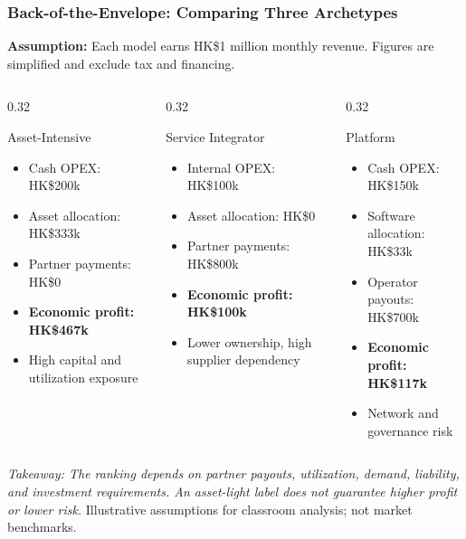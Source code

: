 \documentclass{beamer}
\begin{document}
\begin{frame}[t,shrink=14]
\frametitle{Back-of-the-Envelope: Comparing Three Archetypes}
\textbf{Assumption:} Each model earns HK\$1 million monthly revenue. Figures are simplified and exclude tax and financing.
\begin{columns}[T]
\begin{column}{0.32\textwidth}\begin{block}{Asset-Intensive}
\begin{itemize}
\item Cash OPEX: HK\$200k
\item Asset allocation: HK\$333k
\item Partner payments: HK\$0
\item \textbf{Economic profit: HK\$467k}
\item High capital and utilization exposure
\end{itemize}\end{block}\end{column}
\begin{column}{0.32\textwidth}\begin{block}{Service Integrator}
\begin{itemize}
\item Internal OPEX: HK\$100k
\item Asset allocation: HK\$0
\item Partner payments: HK\$800k
\item \textbf{Economic profit: HK\$100k}
\item Lower ownership, high supplier dependency
\end{itemize}\end{block}\end{column}
\begin{column}{0.32\textwidth}\begin{block}{Platform}
\begin{itemize}
\item Cash OPEX: HK\$150k
\item Software allocation: HK\$33k
\item Operator payouts: HK\$700k
\item \textbf{Economic profit: HK\$117k}
\item Network and governance risk
\end{itemize}\end{block}\end{column}
\end{columns}
\textit{Takeaway: The ranking depends on partner payouts, utilization, demand, liability, and investment requirements. An asset-light label does not guarantee higher profit or lower risk.}
\vfill{\tiny Illustrative assumptions for classroom analysis; not market benchmarks.}
\end{frame}
\end{document}
